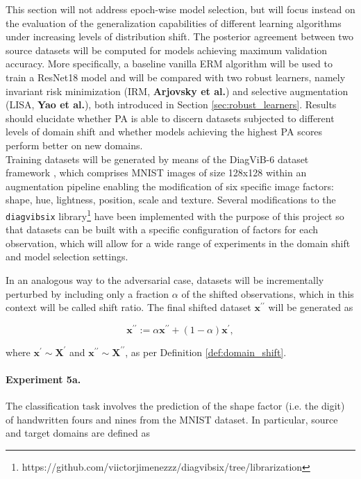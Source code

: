 This section will not address epoch-wise model selection, but will focus instead on 
the evaluation of the generalization capabilities of different learning algorithms under increasing 
levels of distribution shift. The posterior agreement between two source datasets will be computed for 
models achieving maximum validation accuracy. More specifically, a baseline vanilla ERM algorithm will be 
used to train a ResNet18 model and will be compared with two robust 
learners, namely invariant risk minimization (IRM, {\color{tab:orange} \textbf{Arjovsky et al.}}) and selective
augmentation (LISA, {\color{tab:green} \textbf{Yao et al.}}), both introduced in Section \ref{sec:robust_learners}. Results should
elucidate whether PA is able to discern datasets subjected to different levels of domain shift and
whether models achieving the highest PA scores perform better on new domains.\\

Training datasets will be generated by means of the DiagViB-6 dataset
framework \cite{euligDiagViB6DiagnosticBenchmark2021}, 
which comprises MNIST images of size 128x128 within an augmentation pipeline enabling
the modification of six specific image factors: shape, hue, lightness, position,
scale and texture. Several modifications to the \texttt{diagvibsix}
library\footnote{https://github.com/viictorjimenezzz/diagvibsix/tree/librarization}
have been implemented with the purpose 
of this project so that datasets can be built with a specific configuration of factors 
for each observation, which will allow for a wide range of experiments in the domain shift
and model selection settings.

\begin{definition}
    In an analogous way to the adversarial case, datasets will be incrementally perturbed by including only
    a fraction $\alpha$ of the shifted observations, which in this context will be called shift ratio. 
    The final shifted dataset $\bm{x}^{\prime \prime}$ will be generated as

    $$
    \bm{x}^{\prime \prime} := \alpha \bm{x}^{\prime \prime} + (1 - \alpha) \bm{x}^{ \prime},
    $$

    where $\bm{x}^{\prime} \sim \bm{X}^{\prime}$ and $\bm{x}^{\prime \prime} \sim \bm{X}^{\prime \prime}$, as per Definition \ref{def:domain_shift}.
\end{definition}

\paragraph{Experiment 5a.}\label{exp:shifted_factors_experiment}
    The classification task involves the prediction of the shape factor (i.e. the digit)
    of handwritten fours and nines from the MNIST dataset. In particular, source and target
    domains are defined as

